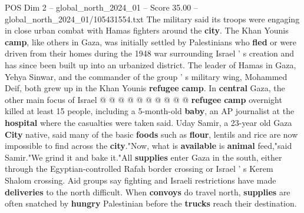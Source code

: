 \begin{textsample}{POS Dim 2 – global\_north\_2024\_01 – Score 35.00 – global\_north\_2024\_01/105431554.txt}
The military said its troops were engaging in close urban combat with Hamas fighters around the \textbf{city}.
The Khan Younis \textbf{camp}, like others in Gaza, was initially settled by Palestinians who \textbf{fled} or were driven from their homes during the 1948 war surrounding Israel ' s creation and has since been built up into an urbanized district.
The leader of Hamas in Gaza, Yehya Sinwar, and the commander of the group ' s military wing, Mohammed Deif, both grew up in the Khan Younis \textbf{refugee} \textbf{camp}.
In \textbf{central} Gaza, the other main focus of Israel @ @ @ @ @ @ @ @ @ @ \textbf{refugee} \textbf{camp} overnight killed at least 15 people, including a 5-month-old \textbf{baby}, an AP journalist at the \textbf{hospital} where the casualties were taken said.
Uday Samir, a 23-year old Gaza \textbf{City} native, said many of the basic \textbf{foods} such as \textbf{flour}, lentils and rice are now impossible to find across the \textbf{city}."Now, what is \textbf{available} is \textbf{animal} feed,"said Samir."We grind it and bake it."All \textbf{supplies} enter Gaza in the south, either through the Egyptian-controlled Rafah border crossing or Israel ' s Kerem Shalom crossing.
Aid groups say fighting and Israeli restrictions have made \textbf{deliveries} to the north difficult.
When \textbf{convoys} do travel north, \textbf{supplies} are often snatched by \textbf{hungry} Palestinian before the \textbf{trucks} reach their destination.

\end{textsample}
